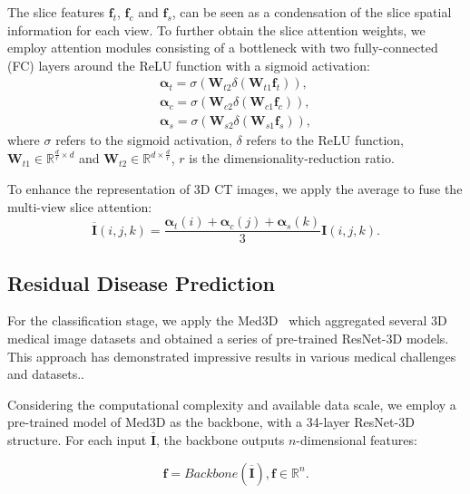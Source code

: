 The slice features $\bm{f}_t$, $\bm{f}_c$ and $\bm{f}_s$, can be seen as a condensation of the slice spatial information for each view.
To further obtain the slice attention weights, we employ attention modules consisting of a bottleneck with two fully-connected (FC) layers around the ReLU\cite{nair2010rectified} function with a sigmoid activation:
\begin{equation}
\begin{aligned}
    \bm{\alpha}_t  = \sigma(\bm{W}_{t2}\delta(\bm{W}_{t1}\bm{f}_t)),\\
    \bm{\alpha}_c  = \sigma(\bm{W}_{c2}\delta(\bm{W}_{c1}\bm{f}_c)),\\
    \bm{\alpha}_s  = \sigma(\bm{W}_{s2}\delta(\bm{W}_{s1}\bm{f}_s)),
\end{aligned}
\end{equation}
where $\sigma$ refers to the sigmoid activation, $\delta$ refers to the ReLU function, $\bm{W}_{t1} \in \mathbb{R}^{\frac{d}{r} \times d}$ and $\bm{W}_{t2} \in \mathbb{R}^{d \times \frac{d}{r}}$, $r$ is the dimensionality-reduction ratio.

To enhance the representation of 3D CT images, we apply the average to fuse the multi-view slice attention: 
\begin{equation}
\overline{\bm{I}}(i,j,k)  = \frac{\bm{\alpha}_t(i) + \bm{\alpha}_c(j) + \bm{\alpha}_s(k)}{3}\bm{I}(i,j,k).
\end{equation}

\subsection{Residual Disease Prediction}
For the classification stage, we apply the Med3D~\cite{chen2019med3d} which aggregated several 3D medical image datasets and obtained a series of pre-trained ResNet-3D models. This approach has demonstrated impressive results in various medical challenges and datasets.\cite{li2021alzheimer}.

Considering the computational complexity and available data scale, we employ a pre-trained model of Med3D as the backbone, with a 34-layer ResNet-3D structure. For each input $\bm{\overline{I}}$, the backbone outputs $n$-dimensional features:

\begin{equation}
\bm{f} = Backbone(\overline{\bm{I}}), \bm{f} \in \mathbb{R}^n.
\end{equation}

